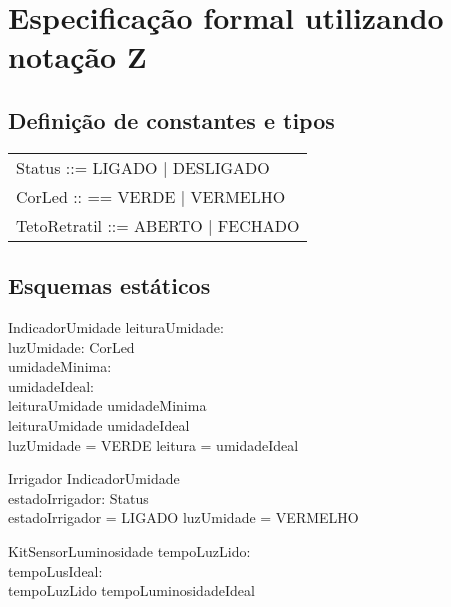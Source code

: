 \newpage

    \section{Especificação formal utilizando notação Z}

        \subsection{Definição de constantes e tipos}

            \begin{tabular}{|l}
                Status ::= LIGADO | DESLIGADO     \\
                CorLed :: == VERDE | VERMELHO     \\
                TetoRetratil ::= ABERTO | FECHADO
            \end{tabular}


        \subsection{Esquemas estáticos}

            \begin{schema}{IndicadorUmidade}
                leituraUmidade: \nat \\
                luzUmidade: CorLed \\
                umidadeMinima: \nat \\
                umidadeIdeal: \nat \\
            \where
                leituraUmidade \geq umidadeMinima \\
                leituraUmidade \leq umidadeIdeal \\
                luzUmidade = VERDE \iff leitura = umidadeIdeal \\
            \end{schema}

            \begin{schema}{Irrigador}
                IndicadorUmidade \\
                estadoIrrigador: Status\\
            \where
                estadoIrrigador = LIGADO \iff luzUmidade = VERMELHO \\
            \end{schema}

            \begin{schema}{KitSensorLuminosidade}
                tempoLuzLido: \nat \\
                tempoLusIdeal: \nat \\
            \where
                tempoLuzLido \leq tempoLuminosidadeIdeal \\
            \end{schema}

